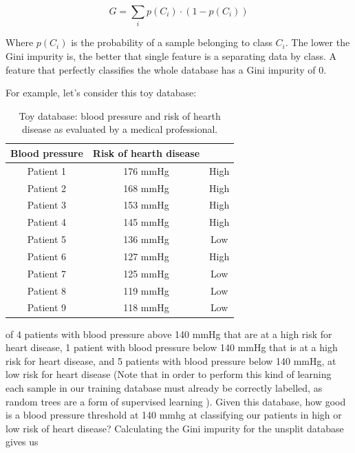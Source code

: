\documentclass[a4paper]{report}
\begin{document}
\begin{equation}
    G = \sum_i p(C_i) \cdot (1 - p(C_i))
\end{equation}

Where $p(C_i)$ is the probability of a sample belonging to class $C_i$.
The lower the Gini impurity is, the better that single feature is a separating data by class.
A feature that perfectly classifies the whole database has a Gini impurity of 0.

For example, let's consider this toy database:

\begin{table}[H]
  \begin{center}
    \begin{tabular}{c|c|c} %
      \textbf{Blood pressure} & \textbf{Risk of hearth disease}\\
      \hline
      Patient 1 &  176 mmHg & High\\
      Patient 2 &  168 mmHg & High\\
      Patient 3 &  153 mmHg & High\\
      Patient 4 &  145 mmHg & High\\
      Patient 5 &  136 mmHg & Low\\
      Patient 6 &  127 mmHg & High\\
      Patient 7 &  125 mmHg & Low\\
      Patient 8 &  119 mmHg & Low\\
      Patient 9 &  118 mmHg & Low\\
    \end{tabular}
    \caption{Toy database: blood pressure and risk of hearth disease as evaluated by a medical professional.}
    \label{tree_table}
  \end{center}
\end{table}


of 4 patients with blood pressure above 140 mmHg that are at a high risk for heart disease, 1 patient with blood pressure below 140 mmHg that is at a high risk for heart disease, and 5 patients with blood pressure below 140 mmHg, at low risk for heart disease (Note that in order to perform this kind of learning each sample in our training database must already be correctly labelled, as random trees are a form of supervised learning ).
Given this database, how good is a blood pressure threshold at 140 mmhg at classifying our patients in high or low risk of heart disease?
Calculating the Gini impurity for the unsplit database gives us
\end{document}
